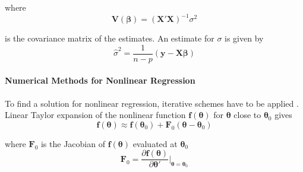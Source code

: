 where
\begin{equation}
\label{eq:linear_ls_covariance}
\mathbf{V} (\boldsymbol{\beta}) = (\mathbf{X}' \mathbf{X})^{-1} {\sigma}^2
\end{equation}

is the covariance matrix of the estimates. An estimate for ${\sigma}$ is given by
\begin{equation}
\hat{\sigma}^2 = \frac{1}{n-p} (\mathbf{y} - \mathbf{X} \boldsymbol{\beta})
\end{equation}

\paragraph{Numerical Methods for Nonlinear Regression\\}
To find a solution for nonlinear regression, iterative schemes have to be applied \citep{Seber}.
Linear Taylor expansion of the nonlinear function
$\mathbf{f}(\boldsymbol{\theta})$ 
for 
$\boldsymbol{\theta}$
close to 
$\boldsymbol{\theta}_0$
gives
\begin{equation}
\label{eq:linearized_f}
\mathbf{f}(\boldsymbol{\theta}) \approx
\mathbf{f}(\boldsymbol{\theta}_0) + \mathbf{F}_0(\boldsymbol{\theta} - \boldsymbol{\theta}_0)
\end{equation}

where $\mathbf{F}_0$ is the Jacobian of $\mathbf{f}(\boldsymbol{\theta})$ 
evaluated at $\boldsymbol{\theta}_0$
\begin{equation}
\mathbf{F}_0 = \frac{\partial \mathbf{f}(\boldsymbol{\theta})} {\partial \boldsymbol{\theta}'} \bigg|_{\boldsymbol{\theta} = \boldsymbol{\theta}_0}
\end{equation}


